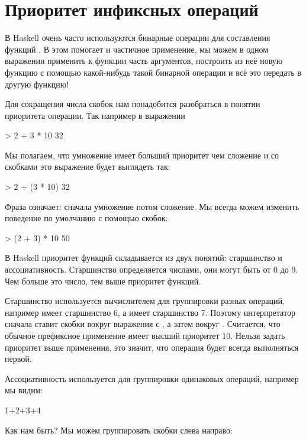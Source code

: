 \section{Приоритет инфиксных операций}

В Haskell очень часто используются 
бинарные операции для составления функций .
В этом помогает и частичное применение, мы можем в одном
выражении применить к функции часть аргументов, построить 
из неё новую функцию с помощью какой-нибудь такой бинарной
операции и всё это передать в другую функцию! 

Для сокращения числа скобок нам понадобится разобраться в
понятии приоритета операции. Так например в выражении 

\begin{code}
> 2 + 3 * 10
32
\end{code}

Мы полагаем, что умножение имеет больший приоритет чем
сложение и со скобками это выражение будет выглядеть так:

\begin{code}
> 2 + (3 * 10)
32
\end{code}

Фраза  означает: сначала умножение
потом сложение. Мы всегда можем изменить поведение по умолчанию
с помощью скобок:

\begin{code}
> (2 + 3) * 10
50
\end{code}

В Haskell приоритет функций складывается из двух понятий:
старшинство и ассоциативность. Старшинство определяется числами,
они могут быть от 0 до 9. Чем больше это число, тем выше приоритет
функций. 

Старшинство используется вычислителем для группировки 
разных операций, например \In{(+)} имеет старшинство 6, а 
\In{(*)} имеет старшинство 7. Поэтому интерпретатор сначала
ставит скобки вокруг выражения с \In{(*)}, а затем вокруг \In{(+)}.
Считается, что обычное префиксное применение имеет высший приоритет 10.
Нельзя задать приоритет выше применения, это значит, что операция
 будет всегда выполняться первой.

Ассоциативность используется для группировки одинаковых
операций, например мы видим:

\begin{code}
1+2+3+4
\end{code}

Как нам быть? Мы можем группировать скобки слева направо:

